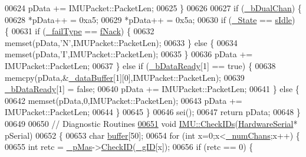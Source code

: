 \begin{DoxyCode}
00624         pData += IMUPacket::PacketLen;
00625     \}
00626 
00627     \textcolor{keywordflow}{if} (\hyperlink{class_i_m_u_a62978e791838c3b4829e1d3d683e99b2}{_bDualChan}) \{
00628         *pData++ = 0xa5;
00629         *pData++ = 0x5a;
00630         \textcolor{keywordflow}{if} (\hyperlink{class_i_m_u_a2e3c70d02cc2b3dd98ce8153d02cf04e}{_State} == \hyperlink{class_i_m_u_a7b5e1bf1cf1407b3e4cf0dd2e18b523fa82181a217d68f26cba06b38cfb94c1bc}{sIdle}) \{
00631             \textcolor{keywordflow}{if} (\hyperlink{class_i_m_u_a39ed63b67b50c67520c5f8e5a2c26b26}{_failType} == \hyperlink{class_i_m_u_a4edeb07a848734657792b4ef8749fb97a17dff6c1392332855f9e83033dff49f8}{fNack}) \{
00632                 memset(pData,\textcolor{charliteral}{'N'},IMUPacket::PacketLen);
00633             \} \textcolor{keywordflow}{else} \{
00634                 memset(pData,\textcolor{charliteral}{'I'},IMUPacket::PacketLen);
00635             \}
00636             pData += IMUPacket::PacketLen;
00637         \} \textcolor{keywordflow}{else} \textcolor{keywordflow}{if} (\hyperlink{class_i_m_u_a8a71f0728b2d849d1d8e54fcb58aad4e}{_bDataReady}[1] == \textcolor{keyword}{true}) \{
00638             memcpy(pData,&\hyperlink{class_i_m_u_ab87a54288295d4d10d605cf6c21d4d0f}{_dataBuffer}[1][0],IMUPacket::PacketLen);
00639             \hyperlink{class_i_m_u_a8a71f0728b2d849d1d8e54fcb58aad4e}{_bDataReady}[1] = \textcolor{keyword}{false};
00640             pData += IMUPacket::PacketLen;
00641         \} \textcolor{keywordflow}{else} \{
00642             memset(pData,0,IMUPacket::PacketLen);
00643             pData += IMUPacket::PacketLen;
00644         \}
00645     \}
00646     sei();
00647     \textcolor{keywordflow}{return} pData;
00648 \}
00649 
00650 \textcolor{comment}{// Diagnostic Routines}
\hypertarget{_i_m_u_8cpp_source_l00651}{}\hyperlink{class_i_m_u_a74feb2946c48a92b251e28ac256d887b}{00651} \textcolor{keywordtype}{void} \hyperlink{class_i_m_u_a74feb2946c48a92b251e28ac256d887b}{IMU::CheckIDs}(\hyperlink{class_hardware_serial}{HardwareSerial}* pSerial)
00652 \{
00653     \textcolor{keywordtype}{char} \hyperlink{_i_m_u_8cpp_a38e7c3f1ce348a3ed20459d277245263}{buffer}[50];
00654     \textcolor{keywordflow}{for} (\textcolor{keywordtype}{int} x=0;x<\hyperlink{class_i_m_u_a27df580b4559aaf3234469bfe16eb158}{_numChans};x++) \{
00655         \textcolor{keywordtype}{int} retc = \hyperlink{class_i_m_u_a466148932203b7250c83a4c5bb684ca1}{_pMas}->\hyperlink{class_i2_c___master_af2e8e8d92ff48f91ee5395c0e34a2724}{CheckID}(\hyperlink{class_i_m_u_a47ffe20a032e3a890cd3891793a60a40}{_gID}[x]); 
00656         \textcolor{keywordflow}{if} (retc == 0) \{

\end{DoxyCode}
